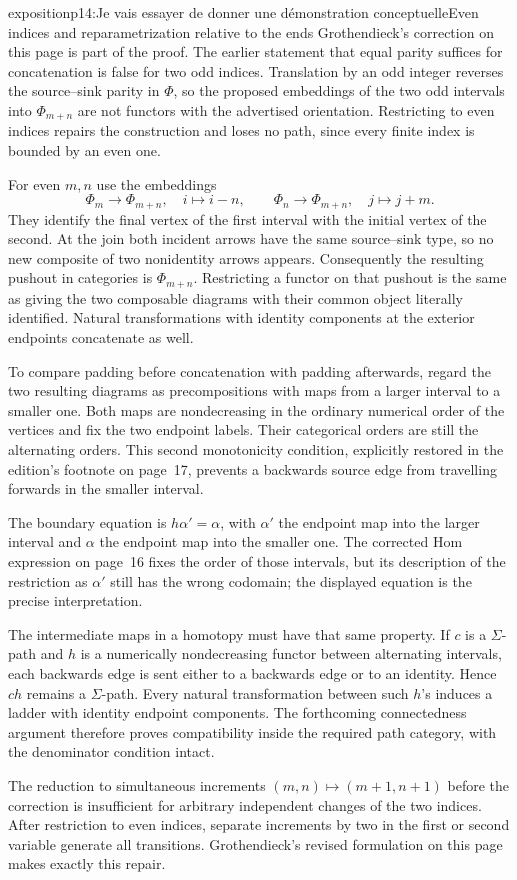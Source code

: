 \begin{dcomment}{exposition}{p14:Je vais essayer de donner une démonstration conceptuelle}{Even indices and reparametrization relative to the ends}
Grothendieck's correction on this page is part of the proof. The earlier statement that equal parity suffices for concatenation is false for two odd indices. Translation by an odd integer reverses the source--sink parity in $\Phi$, so the proposed embeddings of the two odd intervals into $\Phi_{m+n}$ are not functors with the advertised orientation. Restricting to even indices repairs the construction and loses no path, since every finite index is bounded by an even one.

For even $m,n$ use the embeddings
\[
 \Phi_m\longrightarrow\Phi_{m+n},\quad i\longmapsto i-n,
 \qquad
 \Phi_n\longrightarrow\Phi_{m+n},\quad j\longmapsto j+m.
\]
They identify the final vertex of the first interval with the initial vertex of the second. At the join both incident arrows have the same source--sink type, so no new composite of two nonidentity arrows appears. Consequently the resulting pushout in categories is $\Phi_{m+n}$. Restricting a functor on that pushout is the same as giving the two composable diagrams with their common object literally identified. Natural transformations with identity components at the exterior endpoints concatenate as well.

To compare padding before concatenation with padding afterwards, regard the two resulting diagrams as precompositions with maps from a larger interval to a smaller one. Both maps are nondecreasing in the ordinary numerical order of the vertices and fix the two endpoint labels. Their categorical orders are still the alternating orders. This second monotonicity condition, explicitly restored in the edition's footnote on page~17, prevents a backwards source edge from travelling forwards in the smaller interval.

The boundary equation is $h\alpha'=\alpha$, with $\alpha'$ the endpoint map into the larger interval and $\alpha$ the endpoint map into the smaller one. The corrected Hom expression on page~16 fixes the order of those intervals, but its description of the restriction as $\alpha'$ still has the wrong codomain; the displayed equation is the precise interpretation.

The intermediate maps in a homotopy must have that same property. If $c$ is a $\Sigma$-path and $h$ is a numerically nondecreasing functor between alternating intervals, each backwards edge is sent either to a backwards edge or to an identity. Hence $ch$ remains a $\Sigma$-path. Every natural transformation between such $h$'s induces a ladder with identity endpoint components. The forthcoming connectedness argument therefore proves compatibility inside the required path category, with the denominator condition intact.

The reduction to simultaneous increments $(m,n)\mapsto(m+1,n+1)$ before the correction is insufficient for arbitrary independent changes of the two indices. After restriction to even indices, separate increments by two in the first or second variable generate all transitions. Grothendieck's revised formulation on this page makes exactly this repair.
\end{dcomment}

